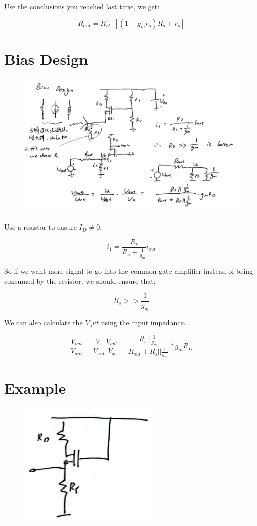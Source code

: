 \documentclass[fontset=windows]{article}
\begin{document}
Use the conclusions you reached last time, we get: 

$$R_{out}=R_D||[(1+g_mr_o)R_s+r_o]$$

\section*{Bias Design}

\begin{figure}[htbp]
    \centering
    \includegraphics[scale=0.8]{8.jpg}
    \captionsetup{labelformat=empty}
    \caption{}
    \label{8}
\end{figure}

Use a resistor to ensure $I_D \neq 0$. 

$$i_1=\frac{R_s}{R_s+\frac{1}{g_m}}i_{out}$$

So if we want more signal to go into the common gate amplifier instead of being consumed by the resistor, we should ensure that: 

$$R_s>>\frac{1}{g_m}$$

We can also calculate the $V_out$ using the input impedance. 

$$\frac{V_{out}}{V_{ant}}=\frac{V_x}{V_{ant}}\frac{V_{out}}{V_x}=\frac{R_s||\frac{1}{g_m}}{R_{out}+R_s||\frac{1}{g_m}}*g_mR_D$$

\section*{Example}

\begin{figure}[htbp]
    \centering
    \includegraphics[scale=0.8]{9.jpg}
    \captionsetup{labelformat=empty}
    \caption{}
    \label{9}
\end{figure}
\end{document}
